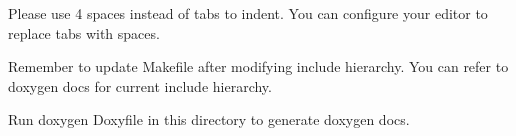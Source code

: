 
\begin{DoxyItemize}
\item Please use 4 spaces instead of tabs to indent. You can configure your editor to replace tabs with spaces.
\item Remember to update Makefile after modifying include hierarchy. You can refer to doxygen docs for current include hierarchy.
\item Run {\ttfamily doxygen Doxyfile} in this directory to generate doxygen docs. 
\end{DoxyItemize}